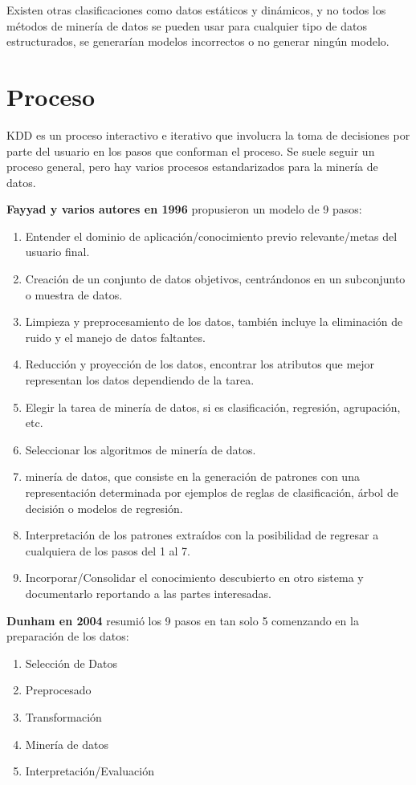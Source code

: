 \documentclass[12pt, twoside, openright]{report} %
\begin{document}
Existen otras clasificaciones como datos estáticos y dinámicos, y no todos los métodos de minería de datos se pueden usar para cualquier tipo de datos estructurados, se generarían modelos incorrectos o no generar ningún modelo.

\section{Proceso}
KDD es un proceso interactivo e iterativo que involucra la toma de decisiones por parte del usuario en los pasos que conforman el proceso. Se suele seguir un proceso general, pero hay varios procesos estandarizados para la minería de datos.

\textbf{Fayyad y varios autores en 1996} propusieron un modelo de 9 pasos:
\begin{enumerate}
	\item Entender el dominio de aplicación/conocimiento previo relevante/metas del usuario final.
	\item Creación de un conjunto de datos objetivos, centrándonos en un subconjunto o muestra de datos.
	\item Limpieza y preprocesamiento de los datos, también incluye la eliminación de ruido y el manejo de datos faltantes.
	\item Reducción y proyección de los datos, encontrar los atributos que mejor representan los datos dependiendo de la tarea.
	\item Elegir la tarea de minería de datos, si es clasificación, regresión, agrupación, etc.
	\item Seleccionar los algoritmos de minería de datos.
	\item minería de datos, que consiste en la generación de patrones  con una representación determinada por ejemplos de reglas de clasificación, árbol de decisión o modelos de regresión.
	\item Interpretación de los patrones extraídos con la posibilidad de regresar a cualquiera de los pasos del 1 al 7.
	\item Incorporar/Consolidar el conocimiento descubierto en otro sistema y documentarlo reportando a las partes interesadas.
\end{enumerate}

\textbf{Dunham en 2004} resumió los 9 pasos en tan solo 5 comenzando en la preparación de los datos:
\begin{enumerate}
	\item Selección de Datos
	\item Preprocesado
	\item Transformación
	\item Minería de datos
	\item Interpretación/Evaluación
\end{enumerate}
\end{document}
